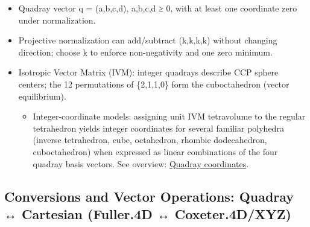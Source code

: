 \documentclass[
  10pt,
]{article}
\providecommand{\tightlist}{%
  \setlength{\itemsep}{0pt}\setlength{\parskip}{0pt}}
\begin{document}
\begin{itemize}
\tightlist
\item
  Quadray vector q = (a,b,c,d), a,b,c,d ≥ 0, with at least one
  coordinate zero under normalization.
\item
  Projective normalization can add/subtract (k,k,k,k) without changing
  direction; choose k to enforce non-negativity and one zero minimum.
\item
  Isotropic Vector Matrix (IVM): integer quadrays describe CCP sphere
  centers; the 12 permutations of \{2,1,1,0\} form the cuboctahedron
  (vector equilibrium).

  \begin{itemize}
  \tightlist
  \item
    Integer-coordinate models: assigning unit IVM tetravolume to the
    regular tetrahedron yields integer coordinates for several familiar
    polyhedra (inverse tetrahedron, cube, octahedron, rhombic
    dodecahedron, cuboctahedron) when expressed as linear combinations
    of the four quadray basis vectors. See overview:
    \href{https://en.wikipedia.org/wiki/Quadray_coordinates}{Quadray
    coordinates}.
  \end{itemize}
\end{itemize}

\subsection{Conversions and Vector Operations: Quadray ↔ Cartesian
(Fuller.4D ↔
Coxeter.4D/XYZ)}\label{conversions-and-vector-operations-quadray-cartesian-fuller.4d-coxeter.4dxyz}
\end{document}

